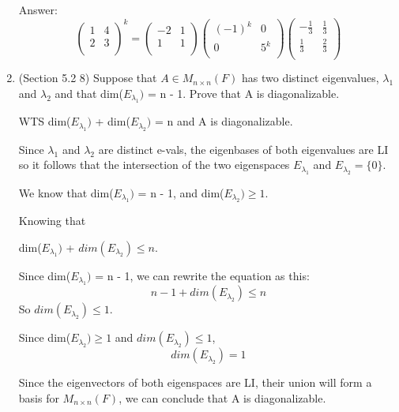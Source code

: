 \documentclass[12pt]{article}
\begin{document}
\begin{enumerate}
Answer:
\begin{equation}
    \begin{pmatrix}
        1 & 4 \\
        2 & 3 \\
    \end{pmatrix}^k = \begin{pmatrix}
        -2 & 1 \\
        1 & 1 \\
    \end{pmatrix}\begin{pmatrix}
        (-1)^k & 0 \\
        0 & 5^k \\
    \end{pmatrix}\begin{pmatrix}
        -\frac{1}{3} & \frac{1}{3} \\
        \frac{1}{3} & \frac{2}{3}\\
    \end{pmatrix}
\end{equation}
    
    \item (Section 5.2 8)
    Suppose that $A \in M_{n \times n}(F)$ has two distinct eigenvalues, $\lambda_1$ and $\lambda_2$ and that dim($E_{\lambda_{1}})$ = n - 1. Prove that A is diagonalizable.

    WTS dim($E_{\lambda_{1}})$ + dim($E_{\lambda_{2}})$ = n and A is diagonalizable. 

    Since $\lambda_1$ and $\lambda_2$ are distinct e-vals, the eigenbases of both eigenvalues are LI so it follows that the intersection of the two eigenspaces $E_{\lambda_{1}}$ and $E_{\lambda_{2}} = \{0\}$. 

    We know that dim($E_{\lambda_{1}})$ = n - 1, and dim($E_{\lambda_{2}}) \geq 1$. 

    Knowing that 

    dim($E_{\lambda_{1}})$ + $dim(E_{\lambda_{2}}) \leq n$. 

    Since dim($E_{\lambda_{1}})$ = n - 1, we can rewrite the equation as this: 
    \begin{equation}
        n - 1 + dim(E_{\lambda_{2}}) \leq n
    \end{equation}
    So $dim(E_{\lambda_{2}}) \leq 1$. 

    Since dim($E_{\lambda_{2}}) \geq 1$ and $dim(E_{\lambda_{2}}) \leq 1$, $$dim(E_{\lambda_{2}}) = 1$$ 

    Since the eigenvectors of both eigenspaces are LI, their union will form a basis for $M_{n \times n}(F)$, we can conclude that A is diagonalizable.


\end{enumerate}
\end{document}
